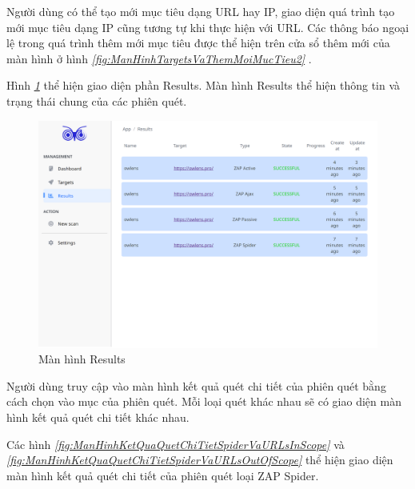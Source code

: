 Người dùng có thể tạo mới mục tiêu dạng URL hay IP, giao diện quá trình tạo mới mục tiêu dạng IP cũng tương tự khi thực hiện với URL.
Các thông báo ngoại lệ trong quá trình thêm mới mục tiêu được thể hiện trên cửa sổ thêm mới của màn hình ở hình \textit{\ref{fig:ManHinhTargetsVaThemMoiMucTieu2} }.

\tab \tab Hình \textit{\ref{fig:ManHinhResults} } thể hiện giao diện phần Results.
Màn hình Results thể hiện thông tin và trạng thái chung của các phiên quét.

\begin{figure}[H]
      \centering
      \includegraphics[width=\textwidth]{applied-thesis-chapters/chapter-6/Màn hình Results.png}
      \caption{Màn hình Results}
      \label{fig:ManHinhResults}
\end{figure}

Người dùng truy cập vào màn hình kết quả quét chi tiết của phiên quét bằng cách chọn vào mục của phiên quét.
Mỗi loại quét khác nhau sẽ có giao diện màn hình kết quả quét chi tiết khác nhau.

Các hình \textit{\ref{fig:ManHinhKetQuaQuetChiTietSpiderVaURLsInScope} } 
và \textit{\ref{fig:ManHinhKetQuaQuetChiTietSpiderVaURLsOutOfScope} } 
thể hiện giao diện màn hình kết quả quét chi tiết của phiên quét loại ZAP Spider.

